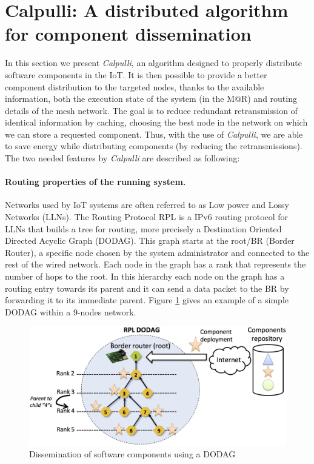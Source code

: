 \section{Calpulli: A distributed algorithm for component dissemination}
In this section we present \textit{Calpulli}, an algorithm designed to properly distribute software components in the IoT.
It is then possible to provide a better component distribution to the targeted nodes, thanks to the available information, both the execution state of the system (in the M@R) and routing details of the mesh network.
The goal is to reduce redundant retransmission of identical information by caching, choosing the best node in the network on which we can store a requested component.
Thus, with the use of \textit{Calpulli}, we are able to save energy while distributing components (by reducing the retransmissions).
The two needed features by \textit{Calpulli} are described as following:
\paragraph{Routing properties of the running system.} Networks used by IoT systems are often referred to as Low power and Lossy Networks (LLNs). The Routing Protocol RPL \cite{rfc6550} is a IPv6 routing protocol for LLNs that builds a tree for routing, more precisely a Destination Oriented Directed Acyclic Graph (DODAG). This graph starts at the root/BR (Border Router), a specific node chosen by the system administrator and connected to the rest of the wired network. Each node in the graph has a rank that represents the number of hops to the root. In this hierarchy each node on the graph has a routing entry towards its parent and it can send a data packet to the BR by forwarding it to its immediate parent. Figure \ref{fig:MARdodag} gives an example of a simple DODAG within a 9-nodes network.

\begin{figure}[htb]
	\centering
	\includegraphics[width=0.98\columnwidth]{chapters/inter-node.images/MAR_dodag.png}
	\caption{Dissemination of software components using a DODAG} \label{fig:MARdodag}
\end{figure}

